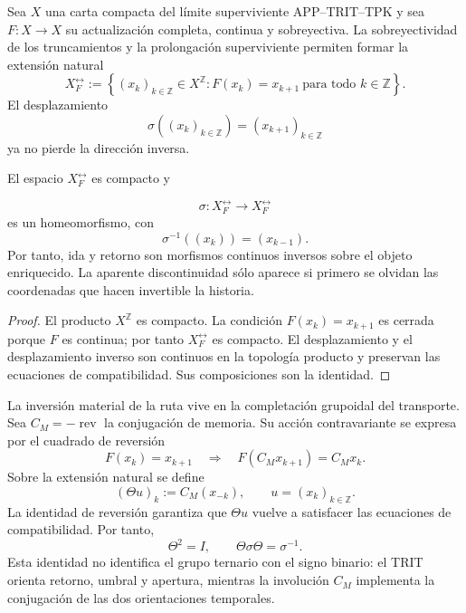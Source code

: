 Sea \(X\) una carta compacta del límite superviviente APP--TRIT--TPK y sea
\(F:X\to X\) su actualización completa, continua y sobreyectiva. La
sobreyectividad de los
truncamientos y la prolongación superviviente permiten formar la extensión
natural
\begin{equation}
 X_F^{\leftrightarrow}
 :=\left\{(x_k)_{k\in\mathbb Z}\in X^{\mathbb Z}:
 F(x_k)=x_{k+1}\ \text{para todo }k\in\mathbb Z\right\}.
 \label{p12-83-c19-s1:hmtch:eq-extension-natural-two-way}
\end{equation}
El desplazamiento
\[
 \sigma((x_k)_{k\in\mathbb Z})=(x_{k+1})_{k\in\mathbb Z}
\]
ya no pierde la dirección inversa.

\begin{theorem}
\label{p12-83-c19-s1:hmtch:thm-extension-natural-two-way}
El espacio \(X_F^{\leftrightarrow}\) es compacto y

\[
 \sigma:X_F^{\leftrightarrow}\longrightarrow X_F^{\leftrightarrow}
\]
es un homeomorfismo, con
\[
 \sigma^{-1}((x_k))=(x_{k-1}).
\]
Por tanto, ida y retorno son morfismos continuos inversos sobre el objeto
enriquecido. La aparente discontinuidad sólo aparece si primero se olvidan
las coordenadas que hacen invertible la historia.
\end{theorem}

\begin{proof}
El producto \(X^{\mathbb Z}\) es compacto. La condición
\(F(x_k)=x_{k+1}\) es cerrada porque \(F\) es continua; por tanto
\(X_F^{\leftrightarrow}\) es compacto. El desplazamiento y el
desplazamiento inverso son continuos en la topología producto y preservan
las ecuaciones de compatibilidad. Sus composiciones son la identidad.
\end{proof}

La inversión material de la ruta vive en la completación grupoidal del
transporte. Sea \(C_M=-\operatorname{rev}\) la conjugación de memoria. Su
acción contravariante se expresa por el cuadrado de reversión
\[
 F(x_k)=x_{k+1}
 \quad\Longrightarrow\quad
 F(C_Mx_{k+1})=C_Mx_k.
\]
Sobre la extensión natural se define
\begin{equation}
 (\Theta u)_k:=C_M(x_{-k}),
 \qquad u=(x_k)_{k\in\mathbb Z}.
 \label{p12-83-c19-s1:hmtch:eq-definicion-espejo-two-way}
\end{equation}
La identidad de reversión garantiza que \(\Theta u\) vuelve a satisfacer
las ecuaciones de compatibilidad. Por tanto,
\begin{equation}
 \Theta^2=I,
 \qquad
 \Theta\sigma\Theta=\sigma^{-1}.
 \label{p12-83-c19-s1:hmtch:eq-espejo-inversion-two-way}
\end{equation}
Esta identidad no identifica el grupo ternario con el signo binario: el
TRIT orienta retorno, umbral y apertura, mientras la involución \(C_M\)
implementa la conjugación de las dos orientaciones temporales.

